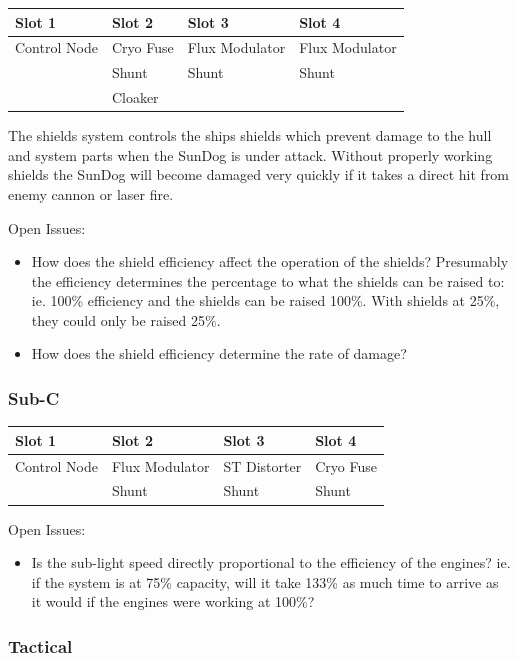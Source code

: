 \begin{itemize}
\begin{tabular}{ | p{2.5cm} | p{2.5cm} | p{2.5cm} | p{2.5cm} | }
\hline
Slot 1 & Slot 2 & Slot 3 & Slot 4 \\ \hline
Control Node & Cryo Fuse & Flux Modulator & Flux Modulator \\
& Shunt & Shunt & Shunt \\
& Cloaker & & \\
\hline
\end{tabular}

The shields system controls the ships shields which prevent damage to
the hull and system parts when the SunDog is under attack.  Without
properly working shields the SunDog will become damaged very quickly
if it takes a direct hit from enemy cannon or laser fire.

Open Issues:
\begin{itemize}
\item How does the shield efficiency affect the operation of the shields?
Presumably the efficiency determines the percentage to what the shields can
be raised to:  ie. 100\% efficiency and the shields can be raised 100\%.
With shields at 25\%, they could only be raised 25\%.
\item How does the shield efficiency determine the rate of damage?
\end{itemize}

\subsubsection{Sub-C}

\begin{tabular}{ | p{2.5cm} | p{2.5cm} | p{2.5cm} | p{2.5cm} | }
\hline
Slot 1 & Slot 2 & Slot 3 & Slot 4 \\ \hline
Control Node & Flux Modulator & ST Distorter & Cryo Fuse\\
& Shunt & Shunt & Shunt \\
\hline
\end{tabular}

Open Issues:
\begin{itemize}
\item Is the sub-light speed directly proportional to the efficiency
of the engines?  ie. if the system is at 75\% capacity, will it take
133\% as much time to arrive as it would if the engines were working at
100\%?
\end{itemize}

\subsubsection{Tactical}


\end{itemize}

